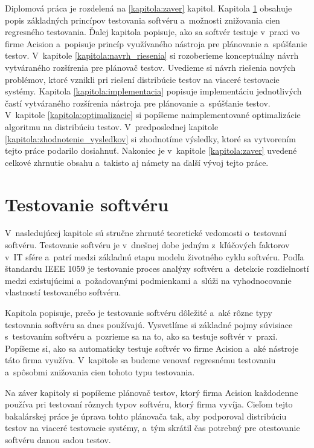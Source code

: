 Diplomová práca je rozdelená na \ref{kapitola:zaver} kapitol. 
Kapitola \ref{kapitola:testovanie_softveru} obsahuje popis základných
princípov testovania softvéru a~možnosti znižovania cien regresného testovania.
Ďalej kapitola popisuje, ako sa softvér testuje v~praxi vo firme Acision
a~popisuje princíp využívaného nástroja pre plánovanie a~spúšťanie testov.
V~kapitole \ref{kapitola:navrh_riesenia} si rozoberieme konceptuálny
návrh vytváraného rozšírenia pre plánovač testov. 
Uvedieme si návrh riešenia nových problémov, ktoré vznikli pri riešení
distribúcie testov na viaceré testovacie systémy.
Kapitola \ref{kapitola:implementacia} popisuje implementáciu jednotlivých
častí vytváraného rozšírenia nástroja pre plánovanie a~spúšťanie testov.
V~kapitole \ref{kapitola:optimalizacie} si popíšeme naimplementované 
optimalizácie algoritmu na distribúciu testov. V~predposlednej kapitole 
\ref{kapitola:zhodnotenie_vysledkov} si zhodnotíme výsledky, ktoré sa 
vytvorením tejto práce podarilo dosiahnuť. Nakoniec je v~kapitole
\ref{kapitola:zaver} uvedené celkové zhrnutie obsahu a~takisto aj námety
na ďalší vývoj tejto práce. 



%
%
\chapter{Testovanie softvéru}
\label{kapitola:testovanie_softveru}
V~nasledujúcej kapitole sú stručne zhrnuté teoretické vedomosti 
o~testovaní softvéru. 
Testovanie softvéru je v~dnešnej dobe jedným z~kľúčových faktorov v~IT 
sfére a~patrí medzi základnú etapu modelu životného cyklu softvéru.
Podľa štandardu IEEE 1059 \cite{Ieee} je testovanie proces analýzy 
softvéru a~detekcie rozdielností medzi existujúcimi a~požadovanými 
podmienkami a~slúži na vyhodnocovanie vlastností testovaného softvéru. 

Kapitola popisuje, prečo je testovanie softvéru 
dôležité a~aké rôzne typy testovania softvéru sa dnes používajú. 
Vysvetlíme si základné pojmy súvisiace s~testovaním softvéru a~pozrieme
sa na to, ako sa testuje softvér v~praxi.
Popíšeme si, ako sa automaticky testuje softvér vo firme Acision
a~aké nástroje táto firma využíva. 
V~kapitole sa budeme venovať regresnému testovaniu a~spôsobmi znižovania
cien tohoto typu testovania. 

Na záver kapitoly si popíšeme plánovač testov, ktorý firma Acision 
každodenne používa pri testovaní rôznych typov softvéru, ktorý firma vyvíja. 
Cieľom tejto bakalárskej práce je úprava tohto plánovača tak, aby 
podporoval distribúciu testov na viaceré testovacie systémy, a~tým skrátil
čas potrebný pre otestovanie softvéru danou sadou testov. 

